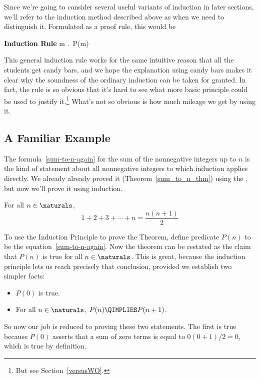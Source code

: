 Since we're going to consider several useful variants of induction in
later sections, we'll refer to the induction method described above as
 when we need to distinguish it.  Formulated as 
a proof rule, this would be
\begin{rul*} \textbf{Induction Rule}
{\forall m \in \naturals.\, P(m)}
\end{rul*}

This general induction rule works for the same intuitive reason that all
the students get candy bars, and we hope the explanation using candy bars
makes it clear why the soundness of the ordinary induction can be taken
for granted.  In fact, the rule is so obvious that it's hard to see what
more basic principle could be used to justify it.\footnote{But see
Section~\ref{versusWO}.}  What's not so obvious is how much mileage 
we get by using it.

\subsection{A Familiar Example}

The formula~\eqref{sum-to-n-again} for the sum of the nonnegative
integers up to $n$ is the kind of statement about all nonnegative
integers to which induction applies directly.  We already already
proved it (Theorem~\ref{sum_to_n_thm}) using the , but now we'll prove it using induction.
\begin{theorem*}%
For all $n \in \naturals$,
\begin{equation}\label{sum-to-n-again}
1 + 2 + 3 + \cdots + n = \frac{n(n+1)}{2}
\end{equation}
\end{theorem*}

To use the Induction Principle to prove the Theorem, define predicate
$P(n)$ to be the equation~\eqref{sum-to-n-again}.  Now the theorem can
be restated as the claim that $P(n)$ is true for all $n \in
\naturals$.  This is great, because the induction principle lets us
reach precisely that conclusion, provided we establish two simpler
facts:
%
\begin{itemize}
\item $P(0)$ is true.
\item For all $n \in \naturals$, $P(n) \QIMPLIES P(n+1)$.
\end{itemize}

So now our job is reduced to proving these two statements.  The first
is true because $P(0)$ asserts that a sum of zero terms is equal to
$0(0+1)/2 = 0$, which is true by definition.

